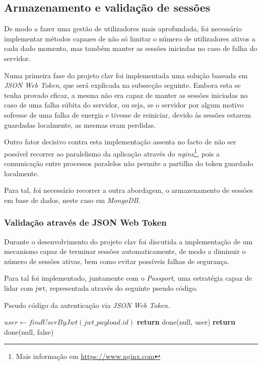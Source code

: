 \cleardoublepage
\subsection{Armazenamento e validação de sessões}

De modo a fazer uma gestão de utilizadores mais aprofundada, foi necessário implementar métodos capazes de não só limitar o número de utilizadores ativos a cada dado momento, mas também manter as sessões iniciadas no caso de falha do servidor.

Numa primeira fase do projeto \gls{clav} foi implementada uma solução baseada em \emph{JSON Web Token}, que será explicada na subsecção seguinte. Embora esta se tenha provado eficaz, a mesma não era capaz de manter as sessões iniciadas no caso de uma falha súbita do servidor, ou seja, se o servidor por algum motivo sofresse de uma falha de energia e tivesse de reiniciar, devido às sessões estarem guardadas localmente, as mesmas eram perdidas.

Outro fator decisivo contra esta implementação assenta no facto de não ser possível recorrer ao paralelismo da aplicação através do \emph{nginx}\footnote{Mais informação em \url{https://www.nginx.com}}, pois a comunicação entre processos paralelos não permite a partilha do token guardado localmente.

Para tal, foi necessário recorrer a outra abordagem, o armazenamento de sessões em base de dados, neste caso em \emph{MongoDB}.

\subsubsection{Validação através de JSON Web Token}

Durante o desenvolvimento do projeto \gls{clav} foi discutida a implementação de um mecanismo capaz de terminar sessões automaticamente, de modo a diminuir o número de sessões ativas, bem como evitar possíveis falhas de segurança.

Para tal foi implementado, juntamente com o \emph{Passport}, uma estratégia capaz de lidar com \gls{jwt}, representada através do seguinte pseudo código.

\begin{algorithm}
    \caption{Pseudo código da autenticação via \emph{JSON Web Token}.}
    \begin{algorithmic}[1]
        \State $user \gets findUserByJwt(jwt\_payload.id)$
            \State \textbf{return} done(null, user)
        \Else
            \State \textbf{return} done(null, false)
        \EndIf
    \EndFunction
    \end{algorithmic}
\end{algorithm}

